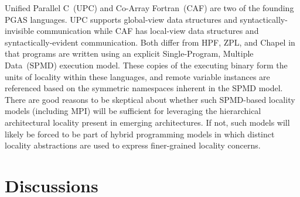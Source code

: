 Unified Parallel C~(UPC) and Co-Array Fortran~(CAF) are two of the
founding PGAS languages.  UPC supports global-view data structures and
syntactically-invisible communication while CAF has local-view data
structures and syntactically-evident communication.  Both differ from
HPF, ZPL, and Chapel in that programs are written using an explicit
Single-Program, Multiple Data~(SPMD) execution model.  These copies of
the executing binary form the units of locality within these
languages, and remote variable instances are referenced based on the
symmetric namespaces inherent in the SPMD model.  There are good
reasons to be skeptical about whether such SPMD-based locality models
(including MPI) will be sufficient for leveraging the hierarchical
architectural locality present in emerging architectures.  If not,
such models will likely be forced to be part of hybrid programming
models in which distinct locality abstractions are used to express
finer-grained locality concerns.




\section{Discussions}


